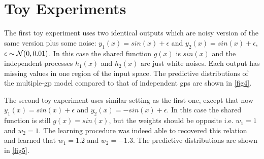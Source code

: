 \documentclass{article} %
\begin{document}

\section{Toy Experiments}
The first toy experiment uses two identical outputs which are noisy version of the same version plus some noise: $y_1(x) = sin(x) + \epsilon$ and $y_2(x) = sin(x) + \epsilon$, $\epsilon \sim \mathcal{N}(0,0.01)$.
In this case the shared function $g(x)$ is $sin(x)$ and the independent processes $h_1(x)$ and $h_2(x)$ are just white noises.
Each output has missing values in one region of the input space.
The predictive distributions of the multiple-gp model compared to that of independent gps are shown in \ref{fig4}.

\noindent The second toy experiment uses similar setting as the first one, except that now $y_1(x) = sin(x) + \epsilon$ and $y_2(x) = -sin(x) + \epsilon$. 
In this case the shared function is still $g(x) = sin(x)$, but the weights should be opposite i.e. $w_1 = 1$ and $w_2 = 1$.
The learning procedure was indeed able to recovered this relation and learned that $w_1 = 1.2$ and $w_2 = -1.3$.
The predictive distributions are shown in \ref{fig5}.
\end{document}
